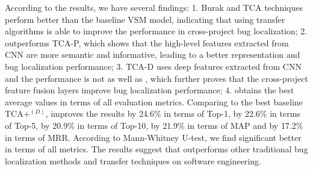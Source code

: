 According to the results, we have several findings: 1. Burak and TCA techniques perform better than the baseline VSM model, indicating that using transfer algorithms is able to improve the performance in cross-project bug localization; 2. \TRANPCNN outperforms TCA-P, which shows that the high-level features extracted from CNN are more semantic and informative, leading to a better representation and bug localization performance; 3. TCA-D uses deep features extracted from CNN and the performance is not as well as \TRANPCNN, which further proves that the cross-project feature fusion layers improve bug localization performance; 4. \TRANPCNN obtains the best average values in terms of all evaluation metrics. Comparing to the best baseline TCA+$^{(D)}$, \TRANPCNN improves the results by 24.6\% in terms of Top-1, by 22.6\% in terms of Top-5, by 20.9\% in terms of Top-10, by 21.9\% in terms of MAP and by 17.2\% in terms of MRR. According to Mann-Whitney U-test, we find \TRANPCNN significant better in terms of all metrics. The results suggest that \TRANPCNN outperforms other traditional bug localization methods and transfer techniques on software engineering.


